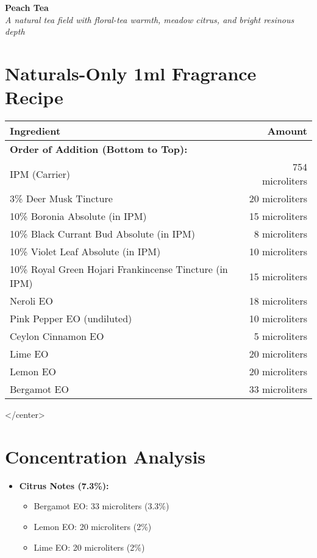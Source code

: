 \documentclass{article}
\begin{document}
\begin{center}
\textcolor{violetPurple}{\LARGE\textbf{Peach Tea}}\\[0.5cm]
\textcolor{colaBrown}{\large\textit{A natural tea field with floral-tea warmth, meadow citrus, and bright resinous depth}}\\[0.5cm]
\end{center}

\section*{Naturals-Only 1ml Fragrance Recipe}

\begin{center}
\begin{tabular}{p{6.5cm}r}
\toprule
\textcolor{colaRed}{\textbf{Ingredient}} & \textcolor{colaRed}{\textbf{Amount}} \\
\midrule
\multicolumn{2}{l}{\textcolor{violetPurple}{\textbf{Order of Addition (Bottom to Top):}}} \\
\midrule
IPM (Carrier) & 754 microliters \\
3\% Deer Musk Tincture & 20 microliters \\
10\% Boronia Absolute (in IPM) & 15 microliters \\
10\% Black Currant Bud Absolute (in IPM) & 8 microliters \\
10\% Violet Leaf Absolute (in IPM) & 10 microliters \\
10\% Royal Green Hojari Frankincense Tincture (in IPM) & 15 microliters \\
Neroli EO & 18 microliters \\
Pink Pepper EO (undiluted) & 10 microliters \\
Ceylon Cinnamon EO & 5 microliters \\
Lime EO & 20 microliters \\
Lemon EO & 20 microliters \\
Bergamot EO & 33 microliters \\
\bottomrule
\end{tabular}
</center>

\vspace{0.5cm}

\section*{Concentration Analysis}
\begin{itemize}[leftmargin=*]
  \item \textcolor{colaRed}{\textbf{Citrus Notes (7.3\%):}}
  \begin{itemize}
    \item Bergamot EO: 33 microliters (3.3\%)
    \item Lemon EO: 20 microliters (2\%)
    \item Lime EO: 20 microliters (2\%)
  \end{itemize}
  

\end{itemize}
\end{center}
\end{document}
